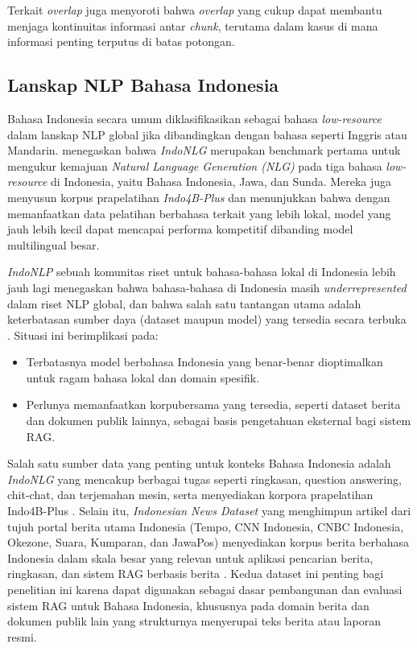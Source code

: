 Terkait \textit{overlap} \cite{zhu2026bestpractices} juga menyoroti bahwa \textit{overlap} yang cukup dapat membantu menjaga kontinuitas informasi antar \textit{chunk}, terutama dalam kasus di mana informasi penting terputus di batas potongan.

\subsection{Lanskap NLP Bahasa Indonesia}
Bahasa Indonesia secara umum diklasifikasikan sebagai bahasa \textit{low-resource} dalam lanskap NLP global jika dibandingkan dengan bahasa seperti Inggris atau Mandarin. \cite{cahyawijaya2021indonlg} menegaskan bahwa \textit{IndoNLG} merupakan benchmark pertama untuk mengukur kemajuan \textit{Natural Language Generation (NLG)} pada tiga bahasa \textit{low-resource} di Indonesia, yaitu Bahasa Indonesia, Jawa, dan Sunda. Mereka juga menyusun korpus prapelatihan \textit{Indo4B-Plus} dan menunjukkan bahwa dengan memanfaatkan data pelatihan berbahasa terkait yang lebih lokal, model yang jauh lebih kecil dapat mencapai performa kompetitif dibanding model multilingual besar.

\textit{IndoNLP} sebuah komunitas riset untuk bahasa-bahasa lokal di Indonesia lebih jauh lagi menegaskan bahwa bahasa-bahasa di Indonesia masih \textit{underrepresented} dalam riset NLP global, dan bahwa salah satu tantangan utama adalah keterbatasan sumber daya (dataset maupun model) yang tersedia secara terbuka \cite{indonlp2022}. Situasi ini berimplikasi pada: 

\begin{itemize}
     \item Terbatasnya model berbahasa Indonesia yang benar-benar dioptimalkan untuk ragam bahasa lokal dan domain spesifik.
     \item Perlunya memanfaatkan korpubersama yang tersedia, seperti dataset berita dan dokumen publik lainnya, sebagai basis pengetahuan eksternal bagi sistem RAG.
\end{itemize}
     
Salah satu sumber data yang penting untuk konteks Bahasa Indonesia adalah \textit{IndoNLG} yang mencakup berbagai tugas seperti ringkasan, question answering, chit-chat, dan terjemahan mesin, serta menyediakan korpora prapelatihan Indo4B-Plus \citep{cahyawijaya2021indonlg}. Selain itu, \textit{Indonesian News Dataset} yang menghimpun artikel dari tujuh portal berita utama Indonesia (Tempo, CNN Indonesia, CNBC Indonesia, Okezone, Suara, Kumparan, dan JawaPos) menyediakan korpus berita berbahasa Indonesia dalam skala besar yang relevan untuk aplikasi pencarian berita, ringkasan, dan sistem RAG berbasis berita \citep{maulana2023indonesiannews}. Kedua dataset ini penting bagi penelitian ini karena dapat digunakan sebagai dasar pembangunan dan evaluasi sistem RAG untuk Bahasa Indonesia, khususnya pada domain berita dan dokumen publik lain yang strukturnya menyerupai teks berita atau laporan resmi. 

